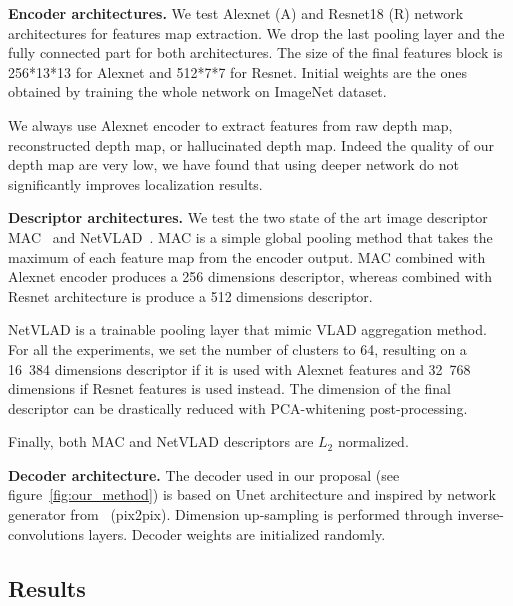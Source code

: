 \vspace{4pt}\noindent\textbf{Encoder architectures.} We test Alexnet (A) and Resnet18 (R) network architectures for features map extraction. We drop the last pooling layer and the fully connected part for both architectures. The size of the final features block is 256*13*13 for Alexnet and 512*7*7 for Resnet. Initial weights are the ones obtained by training the whole network on ImageNet dataset.

We always use Alexnet encoder to extract features from raw depth map, reconstructed depth map, or hallucinated depth map. Indeed the quality of our depth map are very low, we have found that using deeper network do not significantly improves localization results.

\vspace{4pt}\noindent\textbf{Descriptor architectures.} We test the two state of the art image descriptor MAC~\cite{Radenovic2017} and NetVLAD~\cite{Arandjelovic2017}. MAC is a simple global pooling method that takes the maximum of each feature map from the encoder output. MAC combined with Alexnet encoder produces a 256 dimensions descriptor, whereas combined with Resnet architecture is produce a 512 dimensions descriptor.

NetVLAD is a trainable pooling layer that mimic VLAD aggregation method. For all the experiments, we set the number of clusters to 64, resulting on a 16~384 dimensions descriptor if it is used with Alexnet features and 32~768 dimensions if Resnet features is used instead. The dimension of the final descriptor can be drastically reduced with PCA-whitening post-processing.

Finally, both MAC and NetVLAD descriptors are $L_{2}$ normalized.

\vspace{4pt}\noindent\textbf{Decoder architecture.} The decoder used in our proposal (see figure~\ref{fig:our_method}) is based on Unet architecture and inspired by network generator from~\cite{} (pix2pix). Dimension up-sampling is performed through inverse-convolutions layers. Decoder weights are initialized randomly.

\subsection{Results}
\label{subsec:results}

